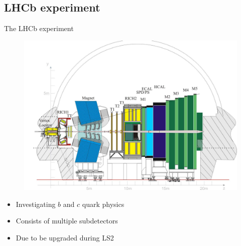 \documentclass{beamer}
\begin{document}
\subsection{LHCb experiment}
\begin{frame}{The LHCb experiment}
  \begin{figure}
    \begin{center}
      \includegraphics[height=0.5\textheight]{figs/lhcb}
    \end{center}
    \vspace*{-0.5cm}
  \end{figure}
  \begin{itemize}
    \item
      Investigating $b$ and $c$ quark physics
    \item
      Consists of multiple subdetectors
    \item
      Due to be upgraded during LS2
  \end{itemize}
\end{frame}
\end{document}
